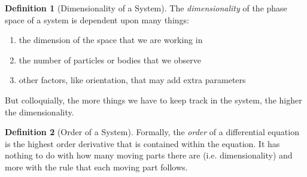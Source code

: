 \documentclass{article}
\theoremstyle{remark}
\theoremstyle{definition}
\newtheorem{definition}{Definition}[section]
\begin{document}
      \begin{definition}[Dimensionality of a System]
      The \textit{dimensionality} of the phase space of a system is dependent upon many things: 
      \begin{enumerate}
          \item the dimension of the space that we are working in
          \item the number of particles or bodies that we observe
          \item other factors, like orientation, that may add extra parameters 
      \end{enumerate}
      But colloquially, the more things we have to keep track in the system, the higher the dimensionality. 
      \end{definition}

      \begin{definition}[Order of a System]
      Formally, the \textit{order} of a differential equation is the highest order derivative that is contained within the equation. It has nothing to do with how many moving parts there are (i.e. dimensionality) and more with the rule that each moving part follows. 
      \end{definition}
\end{document}
